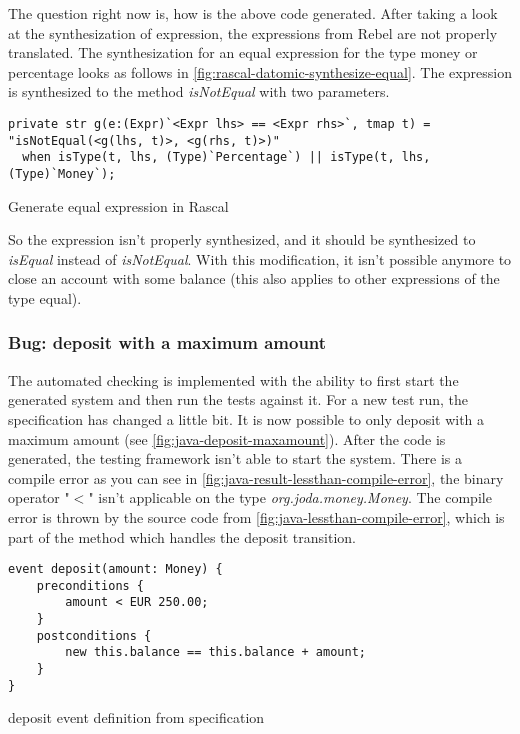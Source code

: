 The question right now is, how is the above code generated.
 After taking a look at the synthesization of
expression, the expressions from Rebel are not properly translated. The
synthesization for an equal expression for the type money or percentage looks as
follows in \autoref{fig:rascal-datomic-synthesize-equal}. The expression is
synthesized to the method \textit{isNotEqual} with two parameters.

\begin{sourcecode}[h!]
\begin{lstlisting}[]
private str g(e:(Expr)`<Expr lhs> == <Expr rhs>`, tmap t) = "isNotEqual(<g(lhs, t)>, <g(rhs, t)>)"
  when isType(t, lhs, (Type)`Percentage`) || isType(t, lhs, (Type)`Money`);
\end{lstlisting}
\caption{Generate equal expression in Rascal}
\label{fig:rascal-datomic-synthesize-equal}
\end{sourcecode}

So the expression isn't properly synthesized, and it should be synthesized to
\textit{isEqual} instead of \textit{isNotEqual}. With this modification, it
isn't possible anymore to close an account with some balance (this also applies
to other expressions of the type equal).

\subsubsection{Bug: deposit with a maximum amount}
\label{sec:bug-compile-max-deposit}

The automated checking is implemented with the ability to first start the
generated system and then run the tests against it. For a new test run, the
specification has changed a little bit. It is now possible to only deposit with
a maximum amount (see \autoref{fig:java-deposit-maxamount}). After the code is
generated, the testing framework isn't able to start the system. There is a
compile error as you can see in
\autoref{fig:java-result-lessthan-compile-error}, the binary operator "$<$"
isn't applicable on the type \textit{org.joda.money.Money}. The compile error
is thrown by the source code from \autoref{fig:java-lessthan-compile-error},
which is part of the method which handles the deposit transition.


\begin{sourcecode}[h!]
\begin{lstlisting}[]
event deposit(amount: Money) {
	preconditions {
		amount < EUR 250.00;
	}
	postconditions {
		new this.balance == this.balance + amount;
	}
}
\end{lstlisting}
\caption{deposit event definition from specification}
\label{fig:java-deposit-maxamount}
\end{sourcecode}

